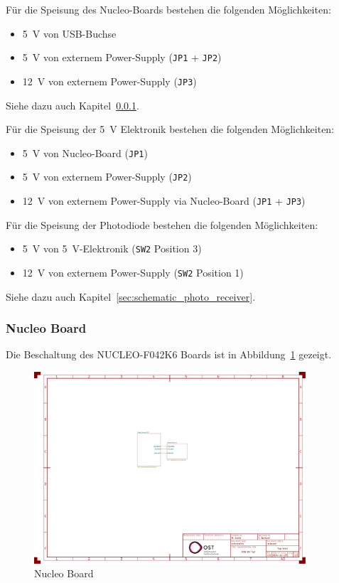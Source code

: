 Für die Speisung des Nucleo-Boards bestehen die folgenden Möglichkeiten:

\begin{itemize}
    \item 5~V von USB-Buchse
    \item 5~V von externem Power-Supply (\lstinline|JP1| + \lstinline|JP2|)
    \item 12~V von externem Power-Supply (\lstinline|JP3|)
\end{itemize}

Siehe dazu auch Kapitel~\ref{sec:schematic_nucleo}.

Für die Speisung der 5~V Elektronik bestehen die folgenden Möglichkeiten:

\begin{itemize}
    \item 5~V von Nucleo-Board (\lstinline|JP1|)
    \item 5~V von externem Power-Supply (\lstinline|JP2|)
    \item 12~V von externem Power-Supply via Nucleo-Board (\lstinline|JP1| + \lstinline|JP3|)
\end{itemize}

Für die Speisung der Photodiode bestehen die folgenden Möglichkeiten:

\begin{itemize}
    \item 5~V von 5~V-Elektronik (\lstinline|SW2| Position 3)
    \item 12~V von externem Power-Supply (\lstinline|SW2| Position 1)
\end{itemize}

Siehe dazu auch Kapitel~\ref{sec:schematic_photo_receiver}.

\subsubsection{Nucleo Board}\label{sec:schematic_nucleo}

Die Beschaltung des NUCLEO-F042K6 Boards \cite{st2024nucleof042k6_usermanual} ist in Abbildung~\ref{fig:nucleo_board}
gezeigt.

\begin{figure}[H]
    \centering
    \includegraphics[page=2, trim=530 580 300 50, clip, width=0.9\textwidth]{attachments/schematic.pdf}
    \caption{Nucleo Board}\label{fig:nucleo_board}
\end{figure}

